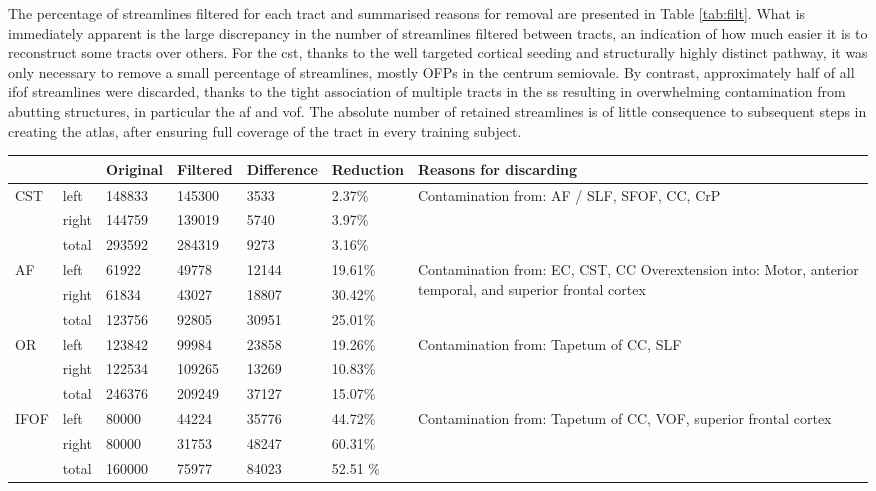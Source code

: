 The percentage of streamlines filtered for each tract and summarised reasons for removal are presented in Table \ref{tab:filt}.
What is immediately apparent is the large discrepancy in the number of streamlines filtered between tracts, an indication of how much easier it is to reconstruct some tracts over others.
For the \gls{cst}, thanks to the well targeted cortical seeding and structurally highly distinct pathway, it was only necessary to remove a small percentage of streamlines, mostly OFPs in the centrum semiovale.
By contrast, approximately half of all \gls{ifof} streamlines were discarded, thanks to the tight association of multiple tracts in the \gls{ss} resulting in overwhelming contamination from abutting structures, in particular the \gls{af} and \gls{vof}.
The absolute number of retained streamlines is of little consequence to subsequent steps in creating the atlas, after ensuring full coverage of the tract in every training subject.

\begin{table*}[t]
  \caption{Streamline filtering statistics. Abbreviations: }
  \label{tab:filt}
  \small
  \begin{tabularx}{\textwidth}{llllll X}\toprule
   &  & Original & Filtered & Difference & Reduction & Reasons for discarding \\
   \midrule
  CST & left & 148833 & 145300 & 3533 & 2.37\% & \multirow{3}{=}{Contamination from: AF / SLF, SFOF, CC, CrP} \\
   & right & 144759 & 139019 & 5740 & 3.97\% &  \\
   & total & 293592 & 284319 & 9273 & 3.16\% &  \\ \addlinespace
  AF & left & 61922 & 49778 & 12144 & 19.61\% & \multirow{3}{=}{Contamination from:  EC, CST, CC Overextension into: Motor, anterior temporal, and superior frontal cortex} \\
   & right & 61834 & 43027 & 18807 & 30.42\% &  \\
   & total & 123756 & 92805 & 30951 & 25.01\% &  \\ \addlinespace
  OR & left & 123842 & 99984 & 23858 & 19.26\% & \multirow{3}{=}{Contamination from: Tapetum of CC, SLF} \\
   & right & 122534 & 109265 & 13269 & 10.83\% &  \\
   & total & 246376 & 209249 & 37127 & 15.07\% & \\ \addlinespace
  IFOF & left & 80000 & 44224 & 35776 & 44.72\% & \multirow{3}{=}{Contamination from: Tapetum of CC, VOF, superior frontal cortex} \\
   & right & 80000 & 31753 & 48247 & 60.31\% &  \\
   & total & 160000 & 75977 & 84023 & 52.51 \% & \\ \toprule
 \end{tabularx}
\end{table*}

